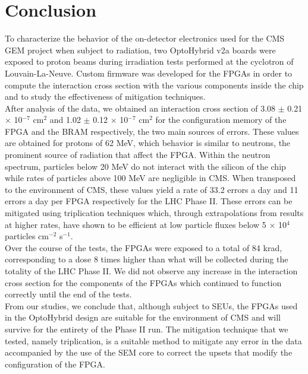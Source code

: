   \section{Conclusion}

    To characterize the behavior of the on-detector electronics used for the CMS GEM project when subject to radiation, two OptoHybrid v2a boards were exposed to proton beams during irradiation tests performed at the cyclotron of Louvain-La-Neuve. Custom firmware was developed for the FPGAs in order to compute the interaction cross section with the various components inside the chip and to study the effectiveness of mitigation techniques.  \\

    After analysis of the data, we obtained an interaction cross section of 3.08 $\pm$ 0.21 $ \times $ 10$^{-7}$ cm$^2$ and 1.02 $\pm$ 0.12 $ \times $ 10$^{-7}$ cm$^2$ for the configuration memory of the FPGA and the BRAM respectively, the two main sources of errors. These values are obtained for protons of 62 MeV, which behavior is similar to neutrons, the prominent source of radiation that affect the FPGA. Within the neutron spectrum, particles below 20 MeV do not interact with the silicon of the chip while rates of particles above 100 MeV are negligible in CMS. When transposed to the environment of CMS, these values yield a rate of 33.2 errors a day and 11 errors a day per FPGA respectively for the LHC Phase II. These errors can be mitigated using triplication techniques which, through extrapolations from results at higher rates, have shown to be efficient at low particle fluxes below 5 $ \times $ 10$^4$ particles cm$^{-2}$ s$^{-1}$. \\

    Over the course of the tests, the FPGAs were exposed to a total of 84 krad, corresponding to a dose 8 times higher than what will be collected during the totality of the LHC Phase II. We did not observe any increase in the interaction cross section for the components of the FPGAs which continued to function correctly until the end of the tests. \\

    From our studies, we conclude that, although subject to SEUs, the FPGAs used in the OptoHybrid design are suitable for the environment of CMS and will survive for the entirety of the Phase II run. The mitigation technique that we tested, namely triplication, is a suitable method to mitigate any error in the data accompanied by the use of the SEM core to correct the upsets that modify the configuration of the FPGA.

